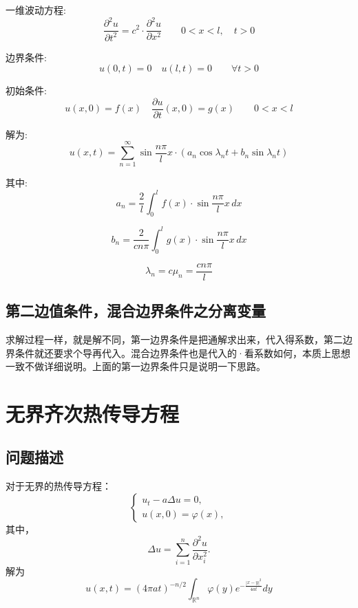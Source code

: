 \documentclass[12pt,a4paper]{article}
\numberwithin{subsection}{section}   %
\numberwithin{subsubsection}{subsection}
\theoremstyle{plain}
\theoremstyle{definition}
\theoremstyle{remark}
\theoremstyle{remark}
\begin{document}
	一维波动方程:
	\begin{equation}
		\frac{\partial^2 u}{\partial t^2} = c^2 \cdot \frac{\partial^2 u}{\partial x^2} \qquad 0 < x < l, \quad t > 0
	\end{equation}
	
	边界条件:
	\begin{equation}
		u(0, t) = 0 \quad u(l, t) = 0 \qquad \forall t > 0
	\end{equation}
	
	初始条件:
	\begin{equation}
		u(x, 0) = f(x) \quad \frac{\partial u}{\partial t}(x, 0) = g(x) \qquad 0 < x < l
	\end{equation}
	
	解为:
	\begin{equation}
		u(x, t) = \sum_{n=1}^{\infty} \sin \frac{n\pi}{l} x \cdot \left( a_n \cos \lambda_n t + b_n \sin \lambda_n t \right)
	\end{equation}
	
	其中:
	\begin{equation}
		a_n = \frac{2}{l} \int_0^l f(x) \cdot \sin \frac{n\pi}{l} x \, dx
	\end{equation}
	
	\begin{equation}
		b_n = \frac{2}{c n \pi} \int_0^l g(x) \cdot \sin \frac{n\pi}{l} x \, dx
	\end{equation}
	
	\begin{equation}
		\lambda_n = c \mu_n = \frac{c n \pi}{l}
	\end{equation}
	
		\subsection{第二边值条件，混合边界条件之分离变量}
求解过程一样，就是解不同，第一边界条件是把通解求出来，代入得系数，第二边界条件就还要求个导再代入。混合边界条件也是代入的·看系数如何，本质上思想一致不做详细说明。上面的第一边界条件只是说明一下思路。
	
	
		\newpage
	\section{无界齐次热传导方程}
	\subsection{问题描述}
	对于无界的热传导方程：
	\begin{equation}
		\begin{cases}\label{wujierechuandao}
			u_t -a\Delta u = 0, \\
			u(x, 0) = \varphi(x),
		\end{cases}
	\end{equation}
	其中，
	\begin{equation}
		\Delta u = \sum_{i=1}^n \frac{\partial^2 u}{\partial x_i^2}.
	\end{equation}
	解为
	\begin{equation}
	u(x, t) = (4\pi a t)^{-n/2} \int_{\mathbb{R}^n} \varphi(y) e^{-\frac{|x - y|^2}{4a t}} dy
\end{equation}
	
\end{document}

